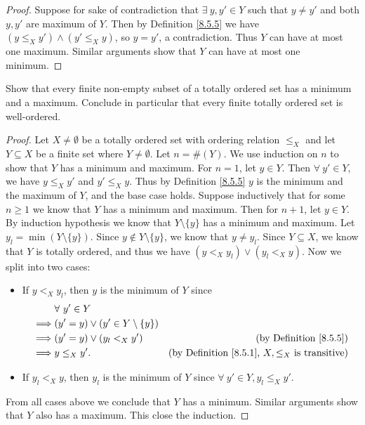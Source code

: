 \begin{proof}
    Suppose for sake of contradiction that \(\exists\ y, y' \in Y\) such that \(y \neq y'\) and both \(y, y'\) are maximum of \(Y\).
    Then by Definition \ref{8.5.5} we have \((y \leq_X y') \land (y' \leq_X y)\), so \(y = y'\), a contradiction.
    Thus \(Y\) can have at most one maximum.
    Similar arguments show that \(Y\) can have at most one minimum.
\end{proof}

\begin{exercise}\label{ex 8.5.8}
    Show that every finite non-empty subset of a totally ordered set has a minimum and a maximum.
    Conclude in particular that every finite totally ordered set is well-ordered.
\end{exercise}

\begin{proof}
    Let \(X \neq \emptyset\) be a totally ordered set with ordering relation \(\leq_X\) and let \(Y \subseteq X\) be a finite set where \(Y \neq \emptyset\).
    Let \(n = \#(Y)\).
    We use induction on \(n\) to show that \(Y\) has a minimum and maximum.
    For \(n = 1\), let \(y \in Y\).
    Then \(\forall\ y' \in Y\), we have \(y \leq_X y'\) and \(y' \leq_X y\).
    Thus by Definition \ref{8.5.5} \(y\) is the minimum and the maximum of \(Y\), and the base case holds.
    Suppose inductively that for some \(n \geq 1\) we know that \(Y\) has a minimum and maximum.
    Then for \(n + 1\), let \(y \in Y\).
    By induction hypothesis we know that \(Y \setminus \{y\}\) has a minimum and maximum.
    Let \(y_l = \min(Y \setminus \{y\})\).
    Since \(y \notin Y \setminus \{y\}\), we know that \(y \neq y_l\).
    Since \(Y \subseteq X\), we know that \(Y\) is totally ordered, and thus we have \((y <_X y_l) \lor (y_l <_X y)\).
    Now we split into two cases:
    \begin{itemize}
        \item If \(y <_X y_l\), then \(y\) is the minimum of \(Y\) since
              \begin{align*}
                           & \forall\ y' \in Y                                                                                          \\
                  \implies & (y' = y) \lor (y' \in Y \setminus \{y\})                                                                   \\
                  \implies & (y' = y) \lor (y_l <_X y')               & \text{(by Definition \ref{8.5.5})}                              \\
                  \implies & y \leq_X y'.                             & \text{(by Definition \ref{8.5.1}, \(X, \leq_X\) is transitive)}
              \end{align*}
        \item If \(y_l <_X y\), then \(y_l\) is the minimum of \(Y\) since \(\forall\ y' \in Y, y_l \leq_X y'\).
    \end{itemize}
    From all cases above we conclude that \(Y\) has a minimum.
    Similar arguments show that \(Y\) also has a maximum.
    This close the induction.
\end{proof}

